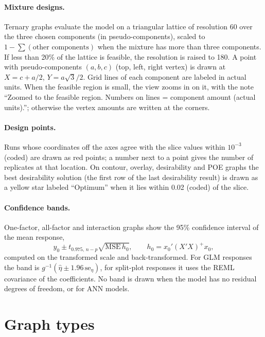 \paragraph{Mixture designs.} Ternary graphs evaluate the model on a triangular lattice of resolution 60
over the three chosen components (in pseudo-components), scaled to $1-\sum(\text{other components})$ when
the mixture has more than three components. If less than 20\% of the lattice is feasible, the resolution is
raised to 180. A point with pseudo-components $(a,b,c)$ (top, left, right vertex) is drawn at
$X=c+a/2$, $Y=a\sqrt3/2$. Grid lines of each component are labeled in actual units. When the feasible
region is small, the view zooms in on it, with the note ``Zoomed to the feasible region. Numbers on lines =
component amount (actual units).''; otherwise the vertex amounts are written at the corners.

\paragraph{Design points.} Runs whose coordinates off the axes agree with the slice values within $10^{-3}$
(coded) are drawn as red points; a number next to a point gives the number of replicates at that location.
On contour, overlay, desirability and POE graphs the best desirability solution (the first row of the last
desirability result) is drawn as a yellow star labeled ``Optimum'' when it lies within 0.02 (coded) of the
slice.

\paragraph{Confidence bands.} One-factor, all-factor and interaction graphs show the 95\% confidence
interval of the mean response,
\begin{equation}
  \hat y_0\pm t_{0.975,\,n-p}\sqrt{\text{MSE}\,h_0},\qquad h_0=x_0'(X'X)^{+}x_0,
  \label{eq:ch06-ci}
\end{equation}
computed on the transformed scale and back-transformed. For GLM responses the band is
$g^{-1}(\hat\eta\pm1.96\,\text{se}_\eta)$, for split-plot responses it uses the REML covariance of the
coefficients. No band is drawn when the model has no residual degrees of freedom, or for ANN models.

\section{Graph types}\label{sec:ch06-types}

